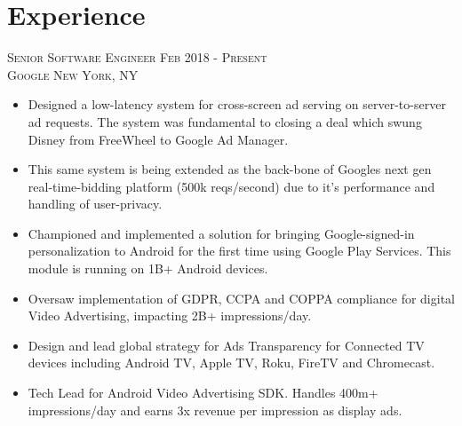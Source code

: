 \section{Experience}

\textsc{Senior Software Engineer \hfill Feb 2018 - Present\\}
\textsc{Google \hfill New York, NY\\}
\begin{itemize}
	\setlength{\itemsep}{1pt}
	\setlength{\parskip}{0pt}
	\setlength{\parsep}{0pt}
	\setlength{\leftmargin}{-5mm}
  \item Designed a low-latency system for cross-screen ad serving on server-to-server ad requests. The system was fundamental to closing a deal which swung Disney from FreeWheel to Google Ad Manager.
  
  \item This same system is being extended as the back-bone of Googles next gen real-time-bidding platform (500k reqs/second) due to it's performance and handling of user-privacy.

  \item Championed and implemented a solution for bringing Google-signed-in personalization to Android for the first time using Google Play Services. This module is running on 1B+ Android devices.

  \item Oversaw implementation of GDPR, CCPA and COPPA compliance for digital Video Advertising, impacting 2B+ impressions/day.

  \item Design and lead global strategy for Ads Transparency for Connected TV devices including Android TV, Apple TV, Roku, FireTV and Chromecast.

  \item Tech Lead for Android Video Advertising SDK. Handles 400m+ impressions/day and earns 3x revenue per impression as display ads.






\end{itemize}

